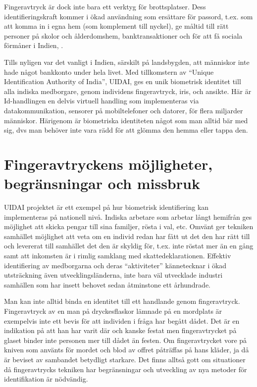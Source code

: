 \documentclass{article}
\begin{document}
Fingeravtryck är dock inte bara ett verktyg för brottsplatser.
Dess identifieringskraft kommer i ökad användning som ersättare för passord, t.ex. som att komma in i egna hem (som komplement till nyckel), ge måltid till rätt personer på skolor och ålderdomshem, banktransaktioner och för att få sociala förmåner i Indien, 
\cite{webuidai}.

Tills nyligen var det vanligt i Indien, särskilt på landsbygden,
att människor inte hade något bankkonto under hela livet. Med tillkomstern av ``Unique Identification Authority of India'', UIDAI,
ges en unik biometrisk identitet  till alla
indiska medborgare, genom individens
fingeravtryck, iris, och ansikte. Här är Id-handlingen en delvis virtuell
handling som implementeras via datakommunikation,  sensorer på
mobiltelefoner och datorer,  för flera miljarder människor. 
Härigenom är biometriska identiteten något som man alltid bär med sig,
dvs man behöver  inte vara rädd för att glömma den hemma eller tappa
den. 
\section{Fingeravtryckens möjligheter, begränsningar och missbruk}
\label{sc:visionen}

UIDAI projektet är ett exempel på hur biometrisk identifiering
kan implementeras på nationell nivå. Indiska arbetare som arbetar
långt hemifrån ges möjlighet att skicka pengar till
sina familjer, rösta i val, etc. Omvänt ger tekniken samhället
möjlighet att veta om en individ redan har fått ut det den har rätt till och levererat till samhället det den är skyldig för,
t.ex.  inte röstat mer än en gång samt att inkomsten är i rimlig samklang med skattedeklarationen. Effektiv identifiering av medborgarna och deras ``aktiviteter'' kännetecknar i ökad utsträckning även
utvecklingsländerna,  inte bara väl utvecklade industri samhällen som har insett behovet sedan åtminstone ett århundrade.

Man kan inte alltid binda en identitet till ett handlande genom fingeravtryck.
  Fingeravtryck av en man på dryckesflaskor lämnade på en mordplats
är exempelvis inte ett  bevis för att individen i fråga har begått dådet. Det är en indikation på att han har varit där och kanske festat men fingeravtrycket på glaset binder inte
personen mer till dådet än festen. Om fingeravtrycket vore på kniven som
använts för mordet och  blod av offret påträffas på hans kläder, ja då är beviset av sambandet betydligt starkare. Det finns alltså gott om situationer då fingeravtrycks
tekniken har begränsningar och utveckling av 
nya metoder för identifikation är nödvändig.
\end{document}
